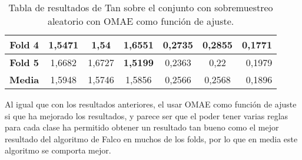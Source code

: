 \begin{table}[H]
{\begin{tabular}{|crrrrrr|}
\multicolumn{1}{|c|}{\textbf{Fold 4}} & \multicolumn{1}{c|}{1,5471}            & \multicolumn{1}{c|}{1,54}                & \multicolumn{1}{c|}{1,6551}          & \multicolumn{1}{c|}{0,2735}            & \multicolumn{1}{c|}{0,2855}              & 0,1771                             \\ \hline
\multicolumn{1}{|c|}{\textbf{Fold 5}} & \multicolumn{1}{c|}{1,6682}            & \multicolumn{1}{c|}{1,6727}              & \multicolumn{1}{c|}{\textbf{1,5199}} & \multicolumn{1}{c|}{0,2363}            & \multicolumn{1}{c|}{0,22}                & 0,1979                             \\ \hline
\multicolumn{1}{|c|}{\textbf{Media}}  & \multicolumn{1}{c|}{1,5948}           & \multicolumn{1}{c|}{1,5746}             & \multicolumn{1}{c|}{1,5856}         & \multicolumn{1}{c|}{0,2566}           & \multicolumn{1}{c|}{0,2568}             & 0,1896                             \\ \hline
\end{tabular}%
}
\caption{Tabla de resultados de Tan sobre el conjunto con sobremuestreo aleatorio con OMAE como función de ajuste.}\label{tablaTANconOMAE}
\end{table}

Al igual que con los resultados anteriores, el usar OMAE como función de ajuste si que ha mejorado los resultados, y parece ser que el poder tener varias reglas para cada clase ha permitido obtener un resultado tan bueno como el mejor resultado del algoritmo de Falco en muchos de los folds, por lo que en media este algoritmo se comporta mejor.

